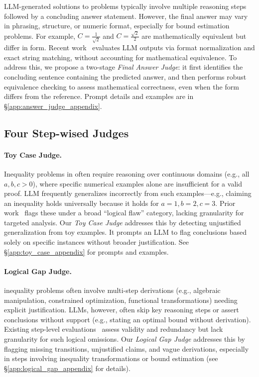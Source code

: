 LLM-generated solutions to \dataset problems typically involve multiple reasoning steps followed by a concluding answer statement. However, the final answer may vary in phrasing, structure, or numeric format, especially for bound estimation problems. For example, $C = \frac{1}{\sqrt{2}}$ and $C = \frac{\sqrt{2}}{2}$ are mathematically equivalent but differ in form. Recent work~\cite{lu2024mathvista} evaluates LLM outputs via format normalization and exact string matching, without accounting for mathematical equivalence. To address this, we propose a two-stage \textit{Final Answer Judge}: it first identifies the concluding sentence containing the predicted answer, and then performs robust equivalence checking to assess mathematical correctness, even when the form differs from the reference. Prompt details and examples are in \S\ref{app:answer_judge_appendix}. 

\vspace{-3mm}
\subsection{Four Step-wised Judges}
\label{sec:step_wise_judges}
\vspace{-2mm}



\paragraph{Toy Case Judge.} Inequality problems in \dataset often require reasoning over continuous domains (e.g., all $a, b, c > 0$), where specific numerical examples alone are insufficient for a valid proof. LLM frequently generalizes incorrectly from such examples—e.g., claiming an inequality holds universally because it holds for $a = 1, b = 2, c = 3$. Prior work~\cite{gao2025omnimath} flags these under a broad ``logical flaw'' category, lacking granularity for targeted analysis. Our  \textit{Toy Case Judge} addresses this by detecting unjustified generalization from toy examples. It prompts an LLM to flag conclusions based solely on specific instances without broader justification. See \S\ref{app:toy_case_appendix} for prompts and examples.

\vspace{-3mm}
\paragraph{Logical Gap Judge.} \dataset inequality problems often involve multi-step derivations (e.g., algebraic manipulation, constrained optimization, functional transformations) needing explicit justification. LLMs, however, often skip key reasoning steps or assert conclusions without support (e.g., stating an optimal bound without derivation). Existing step-level evaluations~\cite{DBLP:reasoneval} assess validity and redundancy but lack granularity for such logical omissions. Our \textit{Logical Gap Judge} addresses this by flagging missing transitions, unjustified claims, and vague derivations, especially in steps involving inequality transformations or bound estimation (see \S\ref{app:logical_gap_appendix} for details). 

